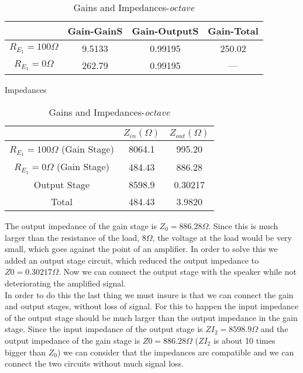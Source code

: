 \begin{table}[H]
\footnotesize
\centering
\caption{Gains and Impedances-\textit{octave}}
\label{tab:bomba}
\begin{center}
\begin{tabular}{|c|c|c | c |} 
\hline
 & Gain-GainS & Gain-OutputS& Gain-Total\\
 \hline
  $R_{E_1}=100 \Omega$ & 9.5133 & 0.99195 & 250.02  \\
 \hline
  $R_{E_1}=0\Omega$ &262.79 & 0.99195 & --- \\
 
 \hline
\end{tabular}
\end{center}
\end{table}
Impedances
\begin{table}[H]
\footnotesize
\centering
\caption{Gains and Impedances-\textit{octave}}
\label{tab:bomba}
\begin{center}
\begin{tabular}{|c|c|c |} 
\hline
 & $Z_{in} (\Omega)$ &$ Z_{out} (\Omega)$\\
 \hline
 $ R_{E_1}=100 \Omega$ (Gain Stage) &  8064.1 & 995.20\\
 \hline
  $R_{E_1}=0\Omega$ (Gain Stage)& 484.43 & 886.28\\
  \hline
  Output Stage & 8598.9 & 0.30217\\
  \hline
  Total & 484.43 & 3.9820\\
  \hline
\end{tabular}
\end{center}
\end{table}
The output impedance of the gain stage is $Z_0=886.28\Omega$. Since this is much larger than the resistance of the load, $8\Omega$, the voltage at the load would be very small, which goes against the point of an amplifier. In order to solve this we added an output stage circuit, which reduced the output impedance to $Z0=0.30217\Omega$. Now we can connect the output stage with the speaker while not deteriorating the amplified signal.\\
In order to do this the last thing we must insure is that we can connect the gain and output stages, without loss of signal. For this to happen the input impedance of the output stage should be much larger than the output impedance in the gain stage. Since the input impedance of the output stage is $Z{I_2}=8598.9\Omega$ and the output impedance of the gain stage is $Z0= 886.28\Omega$ ($Z{I_2}$ is about 10 times bigger than $Z_0$) we can consider that the impedances are compatible and we can connect the two circuits without much signal loss.\\

